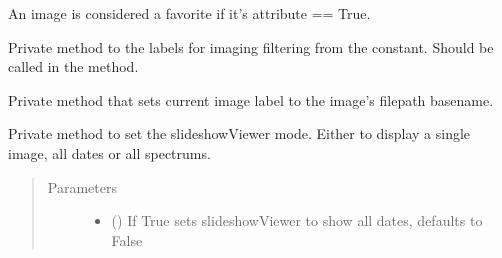 \documentclass[letterpaper,10pt,english]{sphinxmanual}
\begin{document}
\begin{fulllineitems}
\begin{fulllineitems}
An image is considered a favorite if it’s  attribute ==
True.

\end{fulllineitems}


\begin{fulllineitems}
\label{\detokenize{polo.widgets:polo.widgets.slideshow_inspector.slideshowInspector._set_image_class_checkbox_labels}}
Private method to the  labels for imaging filtering
from the  constant. Should be called in
the  method.

\end{fulllineitems}


\begin{fulllineitems}
\label{\detokenize{polo.widgets:polo.widgets.slideshow_inspector.slideshowInspector._set_image_name}}
Private method that sets current image label to the
image’s filepath basename.

\end{fulllineitems}


\begin{fulllineitems}
\label{\detokenize{polo.widgets:polo.widgets.slideshow_inspector.slideshowInspector._set_slideshow_mode}}
Private method to set the slideshowViewer mode. Either to display
a single image, all dates or all spectrums.
\begin{quote}\begin{description}
\item[{Parameters}] \leavevmode\begin{itemize}
\item {} 
 (\sphinxstyleliteralemphasis{\sphinxupquote{, }}) \textendash{} If True sets slideshowViewer to show all
dates, defaults to False


\end{itemize}
\end{description}
\end{quote}
\end{fulllineitems}
\end{fulllineitems}
\end{document}
